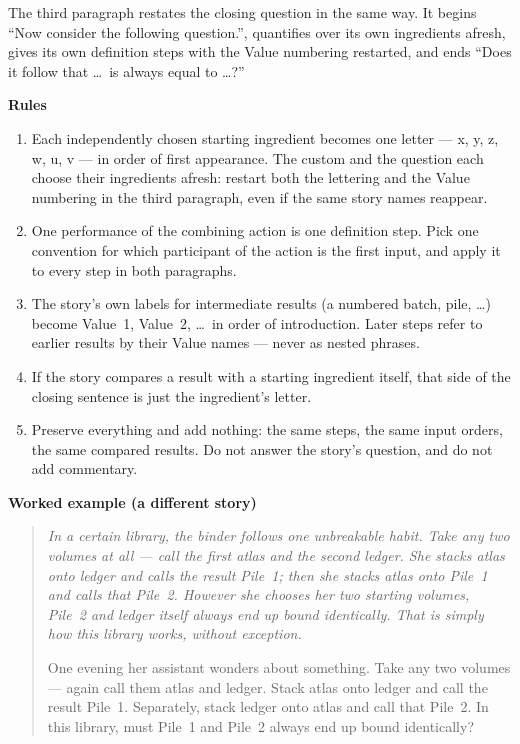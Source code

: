 \documentclass{article}
\begin{document}
\begin{promptbox}
The third paragraph restates the closing question in the same way. It
begins ``Now consider the following question.'', quantifies over its own
ingredients afresh, gives its own definition steps with the Value numbering
restarted, and ends ``Does it follow that \ldots\ is always equal to \ldots?''

\vspace{0.4em}
\noindent\textbf{Rules}
\begin{enumerate}
  \item Each independently chosen starting ingredient becomes one letter ---
    x, y, z, w, u, v --- in order of first appearance. The custom and the
    question each choose their ingredients afresh: restart both the lettering
    and the Value numbering in the third paragraph, even if the same story
    names reappear.
  \item One performance of the combining action is one definition step. Pick
    one convention for which participant of the action is the first input,
    and apply it to every step in both paragraphs.
  \item The story's own labels for intermediate results (a numbered batch,
    pile, \ldots) become Value~1, Value~2, \ldots\ in order of introduction.
    Later steps refer to earlier results by their Value names --- never as
    nested phrases.
  \item If the story compares a result with a starting ingredient itself,
    that side of the closing sentence is just the ingredient's letter.
  \item Preserve everything and add nothing: the same steps, the same input
    orders, the same compared results. Do not answer the story's question,
    and do not add commentary.
\end{enumerate}

\vspace{0.4em}
\noindent\textbf{Worked example (a different story)}
\begin{quote}\itshape
In a certain library, the binder follows one unbreakable habit. Take any
two volumes at all --- call the first atlas and the second ledger. She
stacks atlas onto ledger and calls the result Pile~1; then she stacks
atlas onto Pile~1 and calls that Pile~2. However she chooses her two
starting volumes, Pile~2 and ledger itself always end up bound
identically. That is simply how this library works, without exception.

\medskip
One evening her assistant wonders about something. Take any two volumes ---
again call them atlas and ledger. Stack atlas onto ledger and call the
result Pile~1. Separately, stack ledger onto atlas and call that Pile~2.
In this library, must Pile~1 and Pile~2 always end up bound identically?
\end{quote}


\end{promptbox}
\end{document}
